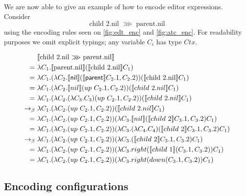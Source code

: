 \documentclass[sigplan,review]{acmart}
\newcommand{\ec}[1]{\ensuremath{\textsf{#1}}\xspace}
\newcommand{\parnt}{\ec{parent}}
\newcommand{\nil}{\ec{nil}}
\begin{document}
\begin{example}
    We are now able to give an example of how to encode editor
    expressions. Consider
    \begin{equation*}
        \text{child\ $2$.nil $\ggg$ parent.nil}
    \end{equation*}
    using the encoding rules seen on \cref{fig:edt_enc} and
    \cref{fig:atc_enc}. For readability purposes we omit explicit
    typings;  any variable $C_i$ has type $Ctx$.
    \begin{small}
    \begin{align*}
         &\ \encode{\text{child\ $2$.nil $\ggg$ parent.nil}} \\
         =&\ \lambda C_1 . \encode{\text{parent.nil}} (\encode{\text{child\ $2$.nil}} C_1) \\
         =&\ \lambda C_1 . (\lambda C_2 . \encode{\nil }(\encode{\parnt} C_2.1, C_2.2)) (\encode{\text{child\ $2$.nil}} C_1) \\
         =&\ \lambda C_1 . (\lambda C_2 . \encode{nil}(up\ C_2.1, C_2.2)) (\encode{child\ 2.nil} C_1) \\
         =&\ \lambda C_1 . (\lambda C_2 . (\lambda C_3 . C_3)(up\ C_2.1, C_2.2)) (\encode{child\ 2.nil} C_1) \\
         \betar&\ \lambda C_1 . (\lambda C_2 . (up\ C_2.1, C_2.2)) (\encode{child\ 2.nil} C_1) \\
         =&\ \lambda C_1 . (\lambda C_2 . (up\ C_2.1, C_2.2)) (\lambda C_3 . \encode{nil} (\encode{child\ 2} C_3.1, C_3.2)C_1) \\
         =&\ \lambda C_1 . (\lambda C_2 . (up\ C_2.1, C_2.2)) (\lambda C_3 . (\lambda C_4.C_4) (\encode{child\ 2} C_3.1, C_3.2)C_1) \\
         \betar&\ \lambda C_1 . (\lambda C_2 . (up\ C_2.1, C_2.2)) (\lambda C_3 . (\encode{child\ 2} C_3.1, C_3.2)C_1) \\
         =&\ \lambda C_1 . (\lambda C_2 . (up\ C_2.1, C_2.2)) (\lambda C_3 . right (\encode{child\ 1} (C_3.1, C_3.2))C_1) \\
         =&\ \lambda C_1 . (\lambda C_2 . (up\ C_2.1, C_2.2)) (\lambda C_3 . right (down (C_3.1, C_3.2))C_1) \\
    \end{align*}
    \end{small}
\end{example}

\subsection{Encoding configurations}
\end{document}
